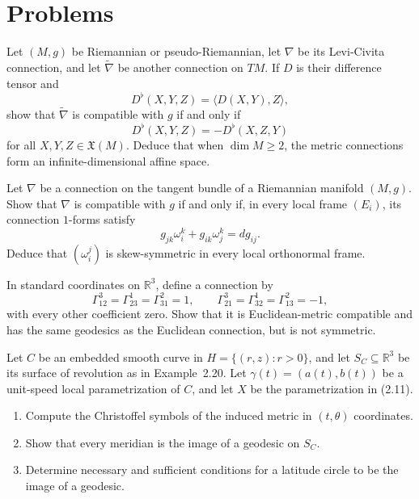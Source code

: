 \section{Problems}

\begin{exercise}
\label{prob:metric-connections-difference-tensor}

Let $(M,g)$ be Riemannian or pseudo-Riemannian, let $\nabla$ be its
Levi-Civita connection, and let $\widetilde\nabla$ be another connection on
$TM$. If $D$ is their difference tensor and
\[
D^\flat(X,Y,Z)=\langle D(X,Y),Z\rangle,
\]
show that $\widetilde\nabla$ is compatible with $g$ if and only if
\[
D^\flat(X,Y,Z)=-D^\flat(X,Z,Y)
\]
for all $X,Y,Z\in\mathfrak X(M)$. Deduce that when $\dim M\geq2$, the metric
connections form an infinite-dimensional affine space.
\end{exercise}

\begin{exercise}
\label{prob:connection-forms-compatibility}

Let $\nabla$ be a connection on the tangent bundle of a Riemannian manifold
$(M,g)$. Show that $\nabla$ is compatible with $g$ if and only if, in every
local frame $(E_i)$, its connection $1$-forms satisfy
\[
g_{jk}\omega_i^k+g_{ik}\omega_j^k=dg_{ij}.
\]
Deduce that $(\omega_i^j)$ is skew-symmetric in every local orthonormal frame.
\end{exercise}

\begin{exercise}
\label{prob:nonsymmetric-euclidean-connection}

In standard coordinates on $\mathbb R^3$, define a connection by
\[
\Gamma_{12}^3=\Gamma_{23}^1=\Gamma_{31}^2=1,
\qquad
\Gamma_{21}^3=\Gamma_{32}^1=\Gamma_{13}^2=-1,
\]
with every other coefficient zero. Show that it is Euclidean-metric compatible
and has the same geodesics as the Euclidean connection, but is not symmetric.
\end{exercise}

\begin{exercise}
\label{prob:christoffel-symbols-surface-revolution}

Let $C$ be an embedded smooth curve in
$H=\{(r,z):r>0\}$, and let $S_C\subseteq\mathbb R^3$ be its surface of
revolution as in Example~2.20. Let $\gamma(t)=(a(t),b(t))$ be a unit-speed
local parametrization of $C$, and let $X$ be the parametrization in (2.11).
\begin{enumerate}
\item[(a)] Compute the Christoffel symbols of the induced metric in
$(t,\theta)$ coordinates.
\item[(b)] Show that every meridian is the image of a geodesic on $S_C$.
\item[(c)] Determine necessary and sufficient conditions for a latitude circle
to be the image of a geodesic.
\end{enumerate}
\end{exercise}

